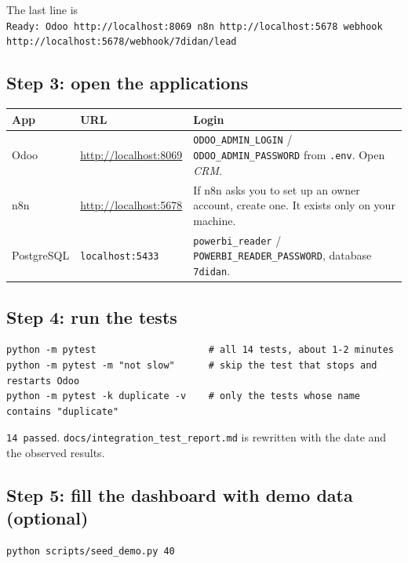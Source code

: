 \documentclass[11pt,a4paper]{article}
\newcommand{\f}[1]{\texttt{#1}}
\begin{document}
\begin{expect}
The last line is\\
\f{Ready: Odoo http://localhost:8069  n8n http://localhost:5678  webhook http://localhost:5678/webhook/7didan/lead}
\end{expect}

\subsection{Step 3: open the applications}

\begin{tabularx}{\textwidth}{l l Y}
  \toprule
  \textbf{App} & \textbf{URL} & \textbf{Login} \\
  \midrule
  Odoo & \url{http://localhost:8069} & \f{ODOO\_ADMIN\_LOGIN} / \f{ODOO\_ADMIN\_PASSWORD} from \f{.env}. Open \emph{CRM}. \\
  n8n & \url{http://localhost:5678} & If n8n asks you to set up an owner account, create one. It exists only on your machine. \\
  PostgreSQL & \f{localhost:5433} & \f{powerbi\_reader} / \f{POWERBI\_READER\_PASSWORD}, database \f{7didan}. \\
  \bottomrule
\end{tabularx}

\subsection{Step 4: run the tests}

\begin{lstlisting}
python -m pytest                    # all 14 tests, about 1-2 minutes
python -m pytest -m "not slow"      # skip the test that stops and restarts Odoo
python -m pytest -k duplicate -v    # only the tests whose name contains "duplicate"
\end{lstlisting}

\begin{expect}
\f{14 passed}. \f{docs/integration\_test\_report.md} is rewritten with the date and the observed results.
\end{expect}

\subsection{Step 5: fill the dashboard with demo data (optional)}

\begin{lstlisting}
python scripts/seed_demo.py 40
\end{lstlisting}
\end{document}
